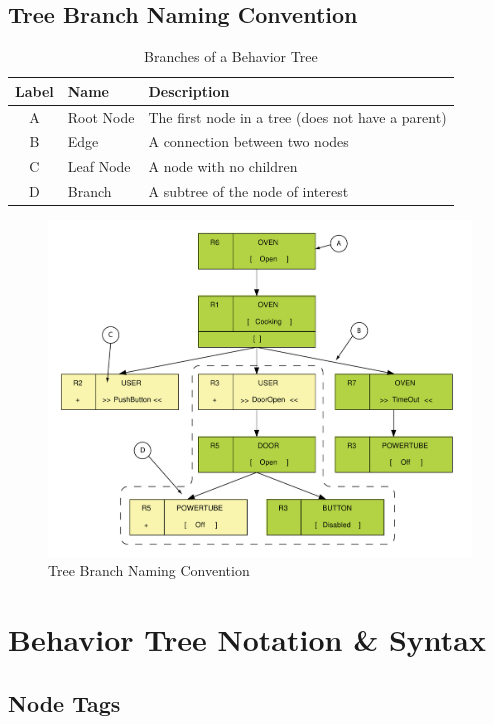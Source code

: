 \documentclass[]{article}
\begin{document}
\subsection{Tree Branch Naming Convention}

\begin{table}
\begin{tabularx}{\textwidth}{|c|l|X|}
 \textbf{Label} & \textbf{Name} & \textbf{Description}\\ \hline
A & Root Node & The first node in a tree (does not have a parent)\\ \hline
B & Edge & A connection between two nodes\\ \hline
C & Leaf Node & A node with no children\\ \hline
D & Branch & A subtree of the node of interest
\end{tabularx}
\caption{Branches of a Behavior Tree}
\label{BTTree Branches}
\end{table}

\begin{figure}
 \includegraphics{figs/AppendixB/Naming/Fig3}
 \caption{Tree Branch Naming Convention}
 \label{fig:Naming3}
\end{figure}

\section{Behavior Tree Notation \& Syntax}

\subsection{Node Tags}
\end{document}
